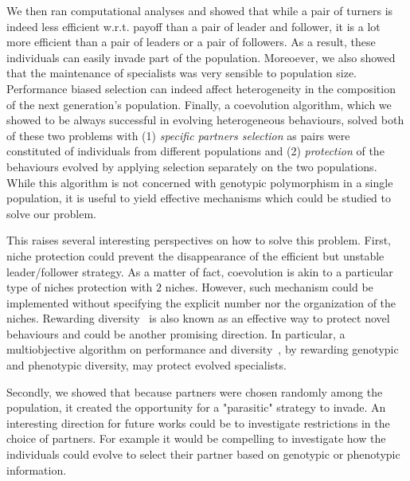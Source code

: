   We then ran computational analyses and showed that while a pair of turners is indeed less efficient w.r.t. payoff than a pair of leader and follower, it is a lot more efficient than a pair of leaders or a pair of followers. As a result, these individuals can easily invade part of the population. Moreoever, we also showed that the maintenance of specialists was very sensible to population size. Performance biased selection can indeed affect heterogeneity in the composition of the next generation's population. Finally, a coevolution algorithm, which we showed to be always successful in evolving heterogeneous behaviours, solved both of these two problems with (1) \emph{specific partners selection} as pairs were constituted of individuals from different populations and (2) \emph{protection} of the behaviours evolved by applying selection separately on the two populations. While this algorithm is not concerned with genotypic polymorphism in a single population, it is useful to yield effective mechanisms which could be studied to solve our problem. 

  This raises several interesting perspectives on how to solve this problem. First, niche protection could prevent the disappearance of the efficient but unstable leader/follower strategy. As a matter of fact, coevolution is akin to a particular type of niches protection with $2$ niches. However, such mechanism could be implemented without specifying the explicit number nor the organization of the niches. Rewarding diversity~\parencite{Lehman2008} is also known as an effective way to protect novel behaviours and could be another promising direction. In particular, a multiobjective algorithm on performance and diversity~\parencite{Doncieux2014}, by rewarding genotypic and phenotypic diversity, may protect evolved specialists.

  Secondly, we showed that because partners were chosen randomly among the population, it created the opportunity for a "parasitic" strategy to invade. An interesting direction for future works could be to investigate restrictions in the choice of partners. For example it would be compelling to investigate how the individuals could evolve to select their partner based on genotypic or phenotypic information.